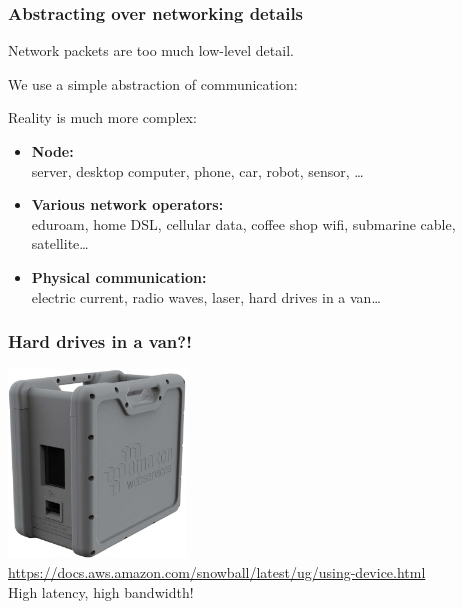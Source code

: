\begin{frame}
    \label{s:networking}
    \frametitle{Abstracting over networking details}
    Network packets are too much low-level detail.

    We use a simple abstraction of communication:
    \begin{center}
    \end{center}\pause

    Reality is much more complex:
    \begin{itemize}
        \item \textbf{Node:}\\ server, desktop computer, phone, car, robot, sensor, \dots\pause
        \item \textbf{Various network operators:}\\ eduroam, home DSL, cellular data, coffee shop wifi, submarine cable, satellite\dots\pause
        \item \textbf{Physical communication:}\\ electric current, radio waves, laser, hard drives in a van\dots
    \end{itemize}
\end{frame}

\begin{frame}[plain]
    \label{s:snowball}
    \frametitle{Hard drives in a van?!}
    \begin{center}
        \includegraphics[height=5cm]{images/aws-snowball.png}\\[0.5em]
        {\scriptsize\url{https://docs.aws.amazon.com/snowball/latest/ug/using-device.html}}\\[1em]
        High latency, high bandwidth!
    \end{center}
\end{frame}

